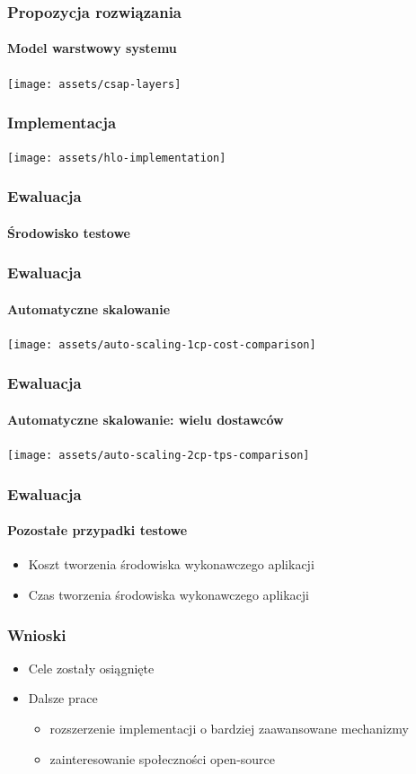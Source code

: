 \documentclass{beamer}
\begin{document}
\begin{frame}
\frametitle{Propozycja rozwiązania}
\framesubtitle{Model warstwowy systemu}
\vspace{2 mm}
\begin{center}
\texttt{[image: assets/csap-layers]}
\end{center}
\end{frame}



\begin{frame}
\frametitle{Implementacja}

\vspace{2 mm}
\begin{center}
\texttt{[image: assets/hlo-implementation]}
\end{center}
\end{frame}



\begin{frame}
\frametitle{Ewaluacja}
\framesubtitle{Środowisko testowe}

\end{frame}




\begin{frame}
\frametitle{Ewaluacja}
\framesubtitle{Automatyczne skalowanie}

\begin{center}
\texttt{[image: assets/auto-scaling-1cp-cost-comparison]}
\end{center}


\end{frame}



\begin{frame}
\frametitle{Ewaluacja}
\framesubtitle{Automatyczne skalowanie: wielu dostawców}

\begin{center}
\texttt{[image: assets/auto-scaling-2cp-tps-comparison]}
\end{center}

\end{frame}


\begin{frame}
\frametitle{Ewaluacja}
\framesubtitle{Pozostałe przypadki testowe}

\begin{itemize}
	\item Koszt tworzenia środowiska wykonawczego aplikacji
	\item Czas tworzenia środowiska wykonawczego aplikacji
\end{itemize}

\end{frame}


\begin{frame}
\frametitle{Wnioski}

\begin{itemize}
	\item Cele zostały osiągnięte
	\item Dalsze prace
		\begin{itemize}
			\item rozszerzenie implementacji o bardziej zaawansowane mechanizmy
			\item zainteresowanie społeczności open-source 
		\end{itemize}
\end{itemize}

\end{frame}
\end{document}
